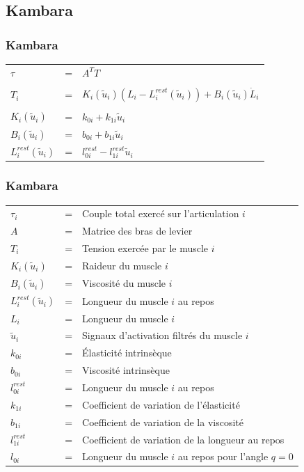 \documentclass{beamer}
\begin{document}

\subsection{Kambara}

\begin{frame}
\frametitle{Kambara}
\begin{tabular}{lcl}
    $\tau$ & = & $A^T T$ \\
    \\
    $T_i$                     & = & $K_i(\tilde{u}_i) (L_i - L_i^{rest}(\tilde{u}_i)) + B_i(\tilde{u}_i) \dot{L}_i$ \\
    \\
    $K_i(\tilde{u}_i)$        & = & $k_{0i} + k_{1i} \tilde{u}_i$ \\
    $B_i(\tilde{u}_i)$        & = & $b_{0i} + b_{1i} \tilde{u}_i$ \\
    $L_i^{rest}(\tilde{u}_i)$ & = & $ l_{0i}^{rest} - l_{1i}^{rest} \tilde{u}_i$ \\
\end{tabular}
\end{frame}

\begin{frame}
\frametitle{Kambara}
\begin{tabular}{lcl}
    $\tau_i$ & = & Couple total exercé sur l'articulation $i$ \\
    $A$  & = & Matrice des bras de levier \\
    $T_i$  & = & Tension exercée par le muscle $i$ \\
    $K_i(\tilde{u}_i)$ & = & Raideur du muscle $i$ \\
    $B_i(\tilde{u}_i)$ & = & Viscosité du muscle $i$ \\
    $L_i^{rest}(\tilde{u}_i)$ & = & Longueur du muscle $i$ au repos \\
    $L_i$ & = & Longueur du muscle $i$ \\
    $\tilde{u}_i$ & = & Signaux d'activation filtrés du muscle $i$ \\
    $k_{0i}$ & = & Élasticité intrinsèque \\
    $b_{0i}$ & = & Viscosité intrinsèque \\
    $l^{rest}_{0i}$ & = & Longueur du muscle $i$ au repos \\
    $k_{1i}$ & = & Coefficient de variation de l'élasticité \\
    $b_{1i}$ & = & Coefficient de variation de la viscosité \\
    $l^{rest}_{1i}$ & = & Coefficient de variation de la longueur au repos \\
    $l_{0i}$ & = & Longueur du muscle $i$ au repos pour l'angle $q = 0$ \\
\end{tabular}
\end{frame}
\end{document}
